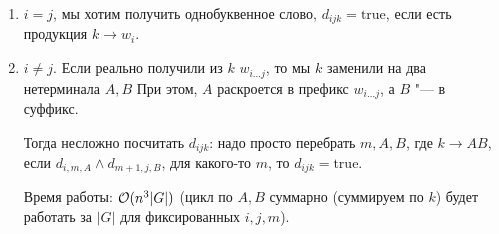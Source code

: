 \begin{enumerate}
\item $i = j$, мы хотим получить однобуквенное слово, $d_{ijk} = \text{true}$, если есть продукция $k \to w_i$.
\item $i \neq j$. 
Если реально получили из $k$ $w_{i \dots j}$, то мы $k$ заменили на два нетерминала $A, B$ При этом, $A$ раскроется в префикс $w_{i \dots j}$, а $B$ "--- в суффикс.

Тогда несложно посчитать $d_{ijk}$: надо просто перебрать $m, A, B$, где $k \to AB$, если $d_{i,m,A} \land d_{m+1,j,B}$, для какого-то $m$, то $d_{ijk} = \text{true}$.

Время работы: $\mathcal{O}(n^3 |G|)$ (цикл по $A, B$ суммарно (суммируем по $k$) будет работать за $|G|$ для фиксированных $i, j, m$).
\end{enumerate}